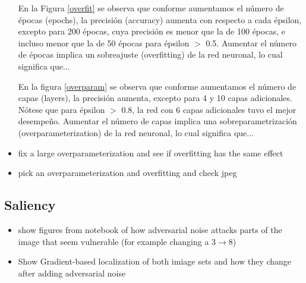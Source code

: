 \begin{itemize}
    En la Figura \ref{overfit} se observa que conforme aumentamos el número de épocas (epochs), la precisión (accuracy) aumenta con respecto a cada épsilon, excepto para 200 épocas, cuya precisión es menor que la de 100 épocas, e incluso menor que la de 50 épocas para épsilon $>$ 0.5. Aumentar el número de épocas implica un sobreajuste (overfitting) de la red neuronal, lo cual significa que...
    
    En la figura \ref{overparam} se observa que conforme aumentamos el número de capas (layers), la precisión aumenta, excepto para 4 y 10 capas adicionales. Nótese que para épsilon $>$ 0.8, la red con 6 capas adicionales tuvo el mejor desempeño. Aumentar el número de capas implica una sobreparametrización (overparameterization) de la red neuronal, lo cual significa que...
    
    \item fix a large overparameterization and see if overfitting has the same effect
    \item pick an overparameterization and overfitting and check jpeg

\end{itemize}
\subsection{Saliency}
\begin{itemize}
    \item show figures from notebook of how adversarial noise attacks parts of the image that seem vulnerable (for example changing a 3$\to$8)
    \item Show Gradient-based localization of both imiage sets and how they change after adding adversarial noise\cite{Selvaraju_2019}
\end{itemize}

